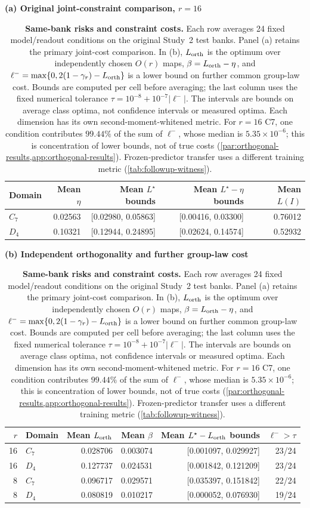 \begin{table}[t]
\centering\small
\setlength{\tabcolsep}{4pt}
\textbf{(a) Original joint-constraint comparison, $r=16$}\par\smallskip
\begin{tabular}{@{}lrrrr@{}}
\toprule
Domain & Mean $\eta$ & Mean $L^\star$ bounds & Mean $L^\star-\eta$ bounds & Mean $L(I)$ \\
\midrule
$C_7$ & 0.02563 & [0.02980, 0.05863] & [0.00416, 0.03300] & 0.76012 \\
$D_4$ & 0.10321 & [0.12944, 0.24895] & [0.02624, 0.14574] & 0.52932 \\
\bottomrule
\end{tabular}
\par\medskip
\textbf{(b) Independent orthogonality and further group-law cost}\par\smallskip
\begin{tabular}{@{}rlrrrr@{}}
\toprule
$r$ & Domain & Mean $L_{\rm orth}$ & Mean $\beta$ & Mean $L^\star-L_{\rm orth}$ bounds & $\ell^->\tau$ \\
\midrule
16 & $C_7$ & 0.028706 & 0.003074 & [0.001097, 0.029927] & 23/24 \\
16 & $D_4$ & 0.127737 & 0.024531 & [0.001842, 0.121209] & 23/24 \\
8 & $C_7$ & 0.096717 & 0.029571 & [0.035397, 0.151842] & 22/24 \\
8 & $D_4$ & 0.080819 & 0.010217 & [0.000052, 0.076930] & 19/24 \\
\bottomrule
\end{tabular}
\caption{\textbf{Same-bank risks and constraint costs.} Each row averages 24 fixed model/readout conditions on the original Study~2 test banks. Panel (a) retains the primary joint-cost comparison. In (b), $L_{\rm orth}$ is the optimum over independently chosen $O(r)$ maps, $\beta=L_{\rm orth}-\eta$, and $\ell^-=\max\{0,2(1-\gamma_r)-L_{\rm orth}\}$ is a lower bound on further common group-law cost. Bounds are computed per cell before averaging; the last column uses the fixed numerical tolerance $\tau=10^{-8}+10^{-7}|\ell^-|$. The intervals are bounds on average class optima, not confidence intervals or measured optima. Each dimension has its own second-moment-whitened metric. For $r=16$ C7, one condition contributes $99.44\%$ of the sum of $\ell^-$, whose median is $5.35\times10^{-6}$; this is concentration of lower bounds, not of true costs (\cref{par:orthogonal-results,app:orthogonal-results}). Frozen-predictor transfer uses a different training metric (\cref{tab:followup-witness}).}
\label{tab:core-risk-summary}
\end{table}
